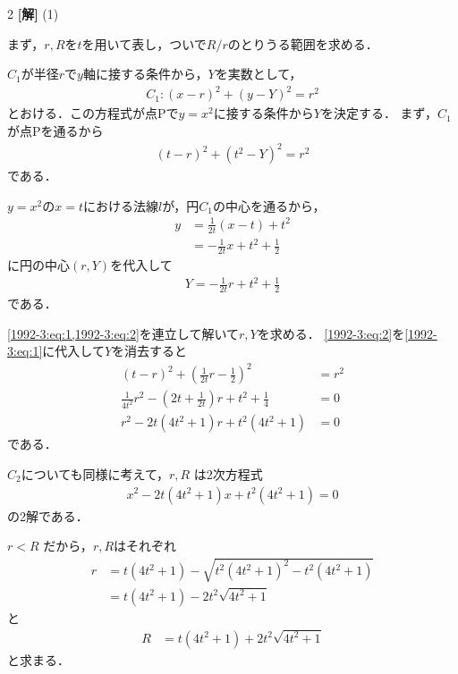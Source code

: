 \documentclass[../../../../main.tex]{subfiles}
\begin{document}
\setcounter{equation}{0}
\begin{oframed}
  
\end{oframed}
\setlength{\columnseprule}{0.4pt}
\begin{multicols}{2}
  {\bf[解]}
  (1)

  まず，$r,R$を$t$を用いて表し，ついで$R/r$のとりうる範囲を求める．

  $C_1$が半径$r$で$y$軸に接する条件から，$Y$を実数として，
  \begin{align*}
    C_1: (x-r)^2 + (y-Y)^2 = r^2
  \end{align*}
  とおける．この方程式が点Pで$y=x^2$に接する条件から$Y$を決定する．
  まず，$C_1$が点Pを通るから
  \begin{align}
    (t-r)^2 + (t^2-Y)^2 = r^2 \label{1992-3:eq:1}
  \end{align}
  である．

  $y=x^2$の$x=t$における法線$l$が，円$C_1$の中心を通るから，
  \begin{align*}
    y
     & = \frac{1}{2t}(x-t) + t^2            \\
     & = -\frac{1}{2t}x + t^2 + \frac{1}{2}
  \end{align*}
  に円の中心$(r,Y)$を代入して
  \begin{align}
    Y = -\frac{1}{2t}r + t^2 + \frac{1}{2}  \label{1992-3:eq:2}
  \end{align}
  である．

  \cref{1992-3:eq:1,1992-3:eq:2}を連立して解いて$r,Y$を求める．
  \cref{1992-3:eq:2}を\cref{1992-3:eq:1}に代入して$Y$を消去すると
  \begin{align*}
    (t-r)^2 + \left(\frac{1}{2t}r-\frac{1}{2}\right)^2                      & = r^2 \\
    \frac{1}{4t^2}r^2 - \left(2t + \frac{1}{2t}\right)r + t^2 + \frac{1}{4} & = 0   \\
    r^2 - 2t(4t^2+1)r + t^2(4t^2+1)                                         & = 0
  \end{align*}
  である．

  $C_2$についても同様に考えて，$r, R$ は2次方程式
  \begin{align*}
    x^2 - 2t(4t^2+1)x + t^2(4t^2+1) = 0
  \end{align*}
  の2解である．

  $r < R$ だから，$r,R$はそれぞれ
  \begin{align}
    r & = t(4t^2+1) - \sqrt{t^2(4t^2+1)^2 - t^2(4t^2+1)}    \\
      & = t(4t^2+1) - 2t^2\sqrt{4t^2+1} \label{1992-3:eq:3}
  \end{align}
  と
  \begin{align}
    R & = t(4t^2+1) + 2t^2\sqrt{4t^2+1} \label{1992-3:eq:4}
  \end{align}
  と求まる．


\end{multicols}
\end{document}
